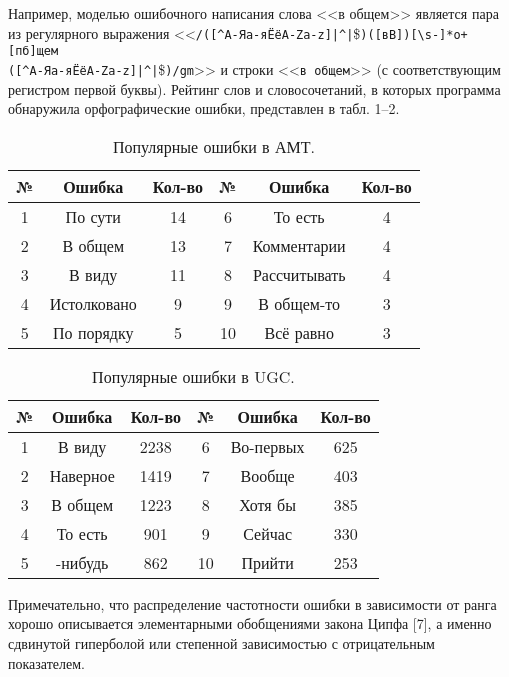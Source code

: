 Например, моделью ошибочного написания слова <<в общем>> является пара из регулярного выражения
\linebreak
<<\verb'/([^А-Яа-яЁёA-Za-z­]|^|'\$\verb')([вВ])[\s-]*о+[пб]щем' \\ \verb'([^А-Яа-яЁёA-Za-z­]|^|'\$\verb')/gm'>> и строки
<<\verb'в общем'>> (с соответствующим регистром первой буквы).
Рейтинг слов и словосочетаний, в которых программа обнаружила орфографические ошибки,
представлен в табл. 1--2.
\begin{table}[h]
\caption{\label{tab:amt_error}Популярные ошибки в АМТ.}
\begin{center}
\begin{tabular}{|c|c|c|c|c|c|}
\hline
{№} & {Ошибка} & {Кол-во} & {№} & {Ошибка} & {Кол-во} \\
\hline
1 & По сути  & 14       &  6 & То есть & 4 \\
2 & В общем & 13        &  7 & Комментарии & 4 \\
3 & В виду  & 11        &  8 & Рассчитывать & 4 \\
4 & Истолковано & 9     &  9 & В общем-то & 3 \\
5 & По порядку & 5      & 10 & Всё равно  & 3 \\
\hline
\end{tabular}
\end{center}
\end{table}
\begin{table}[h]
\caption{\label{tab:ugc_error}Популярные ошибки в UGC.}
\begin{center}
\begin{tabular}{|c|c|c|c|c|c|}
\hline
{№} & {Ошибка} & {Кол-во} & {№} & {Ошибка} & {Кол-во}\\
\hline
1 & В виду & 2238   &  6 & Во-первых & 625 \\
2 & Наверное & 1419 &  7 & Вообще & 403 \\
3 & В общем & 1223  &  8 & Хотя бы & 385 \\
4 & То есть & 901   &  9 & Сейчас & 330 \\
5 & -нибудь & 862   & 10 & Прийти  & 253 \\
\hline
\end{tabular}
\end{center}
\end{table}

Примечательно, что распределение частотности ошибки в зависимости от ранга хорошо описывается
элементарными обобщениями закона Ципфа [7],
а именно сдвинутой гиперболой или степенной зависимостью с отрицательным показателем.

